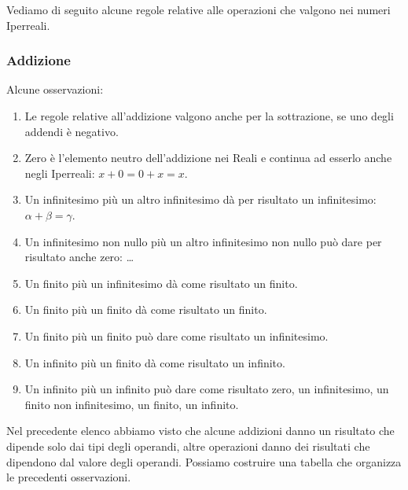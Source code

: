 Vediamo di seguito alcune regole relative alle operazioni 
che valgono nei numeri Iperreali.

\subsubsection{Addizione}
\label{subsec:insnum_addizione}

Alcune osservazioni:
\begin{enumerate} [noitemsep]
 \item Le regole relative all'addizione valgono anche per la sottrazione, se 
uno degli addendi è negativo. 
 \item Zero è l'elemento neutro dell'addizione nei Reali e continua ad esserlo 
anche negli Iperreali: $x+0=0+x=x$.
 \item Un infinitesimo più un altro infinitesimo dà per risultato un 
infinitesimo: $\alpha+\beta=\gamma$.
 \item Un infinitesimo non nullo più un altro infinitesimo non nullo può dare 
per risultato anche zero: \dots
 \item Un finito più un infinitesimo dà come risultato un finito.
 \item Un finito più un finito dà come risultato un finito.
 \item Un finito più un finito può dare come risultato un infinitesimo.
 \item Un infinito più un finito dà come risultato un infinito.
 \item Un infinito più un infinito può dare come risultato zero, un 
infinitesimo, un finito non infinitesimo, un finito, un infinito.
\end{enumerate}

Nel precedente elenco abbiamo visto che alcune addizioni danno un risultato 
che dipende solo dai tipi degli operandi, altre operazioni danno dei risultati 
che dipendono dal valore degli operandi. Possiamo costruire una tabella che 
organizza le precedenti osservazioni.

\begin{center}
\renewcommand{\arraystretch}{.0}
\end{center}

